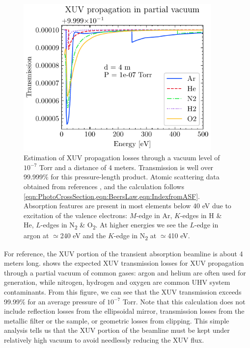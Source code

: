\begin{figure}
	\centering
	\includegraphics[width=0.9\textwidth]{figures/chap2/XUVinVacuum.pdf}
	\caption{Estimation of XUV propagation losses through a vacuum level of $10^{-7}$ Torr and a distance of 4 meters. Transmission is well over 99.999\% for this pressure-length product. Atomic scattering data obtained from references \cite{gulliksonCXROXRayInteractions,henkeXRayInteractionsPhotoabsorption1993}, and the calculation follows \cref{eqn:PhotoCrossSection,eqn:BeersLaw,eqn:IndexfromASF}. Absorption features are present in most elements below 40 eV due to excitation of the valence electrons: $M$-edge in Ar, $K$-edges in H \& He, $L$-edges in N\textsubscript{2} \& O\textsubscript{2}. At higher energies we see the $L$-edge in argon at $\simeq$240 eV and the $K$-edge in N\textsubscript{2} at $\simeq$410 eV.}
	\label{fig:XUVinVacuum}
\end{figure}

For reference, the XUV portion of the transient absorption beamline is about 4 meters long.  shows the expected XUV transmission losses for XUV propagation through a partial vacuum of common gases: argon and helium are often used for generation, while nitrogen, hydrogen and oxygen are common UHV system contaminants. From this figure, we can see that the XUV transmission exceeds 99.99\% for an average pressure of $10^{-7}$ Torr. Note that this calculation does not include reflection losses from the ellipsoidal mirror, transmission losses from the metallic filter or the sample, or geometric losses from clipping. This simple analysis tells us that the XUV portion of the beamline must be kept under relatively high vacuum to avoid needlessly reducing the XUV flux.

